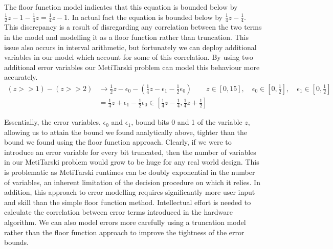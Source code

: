 \documentclass{fac}
\begin{document}
The floor function model indicates that this equation is bounded below by $\frac{1}{2}z - 1 - \frac{1}{4}z = \frac{1}{4}z - 1$. In actual fact the equation is bounded below by $\frac{1}{4}z - \frac{1}{4}$. This discrepancy is a result of disregarding any correlation between the two terms in the model and modelling it as a floor function rather than truncation. This issue also occurs in interval arithmetic, but fortunately we can deploy additional variables in our model which account for some of this correlation. By using two additional error variables our MetiTarski problem can model this behaviour more accurately.
\begin{align*}
(z>>1) - (z>>2) &\rightarrow \frac{1}{2}z - \epsilon_0 - (\frac{1}{4}z - \epsilon_1 - \frac{1}{2}\epsilon_0) \qquad z \in [0,15], \quad \epsilon_0 \in [0,\frac{1}{2}], \quad \epsilon_1 \in [0,\frac{1}{2}] \\   
                &=           \frac{1}{4}z + \epsilon_1 - \frac{1}{2}\epsilon_0 \in [\frac{1}{4}z - \frac{1}{4}, \frac{1}{4}z + \frac{1}{2}]
\end{align*}

Essentially, the error variables, $\epsilon_0$ and $\epsilon_1$, bound bits 0 and 1 of the variable $z$, allowing us to attain the bound we found analytically above, tighter than the bound we found using the floor function approach. Clearly, if we were to introduce an error variable for every bit truncated, then the number of variables in our MetiTarski problem would grow to be huge for any real world design. This is problematic as MetiTarski runtimes can be doubly exponential in the number of variables, an inherent limitation of the decision procedure on which it relies. In addition, this approach to error modelling requires significantly more user input and skill than the simple floor function method. Intellectual effort is needed to calculate the correlation between error terms introduced in the hardware algorithm. We can also model errors more carefully using a truncation model rather than the floor function approach to improve the tightness of the error bounds. 
\end{document}
